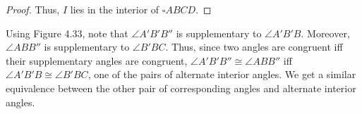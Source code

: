 \documentclass{article}
\begin{document}
\begin{proof}
Thus, $I$ lies in the interior of $\square ABCD$.

\begin{comment}

Similarly, apply Pasch's theorem to $\triangle ABD$ to get that exactly one of (3),(5), and $l$ intersects $BD$ between $B$ and $D$ holds.  In the last case, apply Pasch's theorem to $\triangle BCD$ to get that exactly one of (1), (2), and (4) holds.

Case $C$ lies on $l$.  Then (1) and (2) are ruled out since $C$ is the unique point of intersection with $BC$ and $CD$, respectively. If $D$ lies on $l$, then $l = \gline{CD}$. But $AB$ intersects $l$, so $AB$ does not lie in a half plane of $\gline{CD}$, contradicting the convexity of $\square ABCD$.  Thus, (5) is ruled out.  Suppose (3) held. Since $\square ABCD$ is a quadrilateral, $C \neq O$, so exactly one of the following subcases holds.
\begin{itemize}
\item Subcase $M * C * O$. Since $A*O*D$, $A$ and $O$ lie on the same side of $\gline{CD}$. Since $M * C * O$, $M$ and $O$ lie on opposite sides of $\gline{CD}$. Thus, $A$ and $M$ lie on opposite sides of $\gline{CD}$, so $AB$ intersects $\gline{CD}$, a contradiction.
\item Subcase $M * O * C$.  $C, M$ are on opposite sides of $\gline{AD}$. $M, B$ are on the same side of $\gline{AD}$. Hence, $C,B$ are on opposite sides of $\gline{AD}$, a contradiction.
\item Subcase $O * M * C$. 
\end{itemize}
\end{comment}

\end{proof}

 Using Figure 4.33, note that $\angle A'B'B''$ is supplementary to $\angle A'B'B$. Moreover, $\angle ABB''$ is supplementary to $\angle B'BC$.  Thus, since two angles are congruent iff their supplementary angles are congruent, $\angle A'B'B'' \cong \angle ABB''$ iff $\angle A'B'B \cong \angle B'BC$, one of the pairs of alternate interior angles.  We get a similar equivalence between the other pair of corresponding angles and alternate interior angles.
\end{document}

